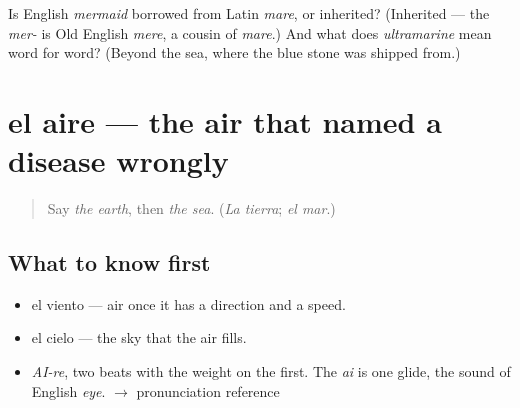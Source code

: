 \begin{tcolorbox}[breakable,colback=teal!4,colframe=teal!35!black,title={Before you move on}]
Is English \emph{mermaid} borrowed from Latin \emph{mare}, or inherited? (Inherited — the \emph{mer-} is Old English \emph{mere}, a cousin of \emph{mare}.) And what does \emph{ultramarine} mean word for word? (Beyond the sea, where the blue stone was shipped from.)
\end{tcolorbox}
\section[el aire]{el aire — the air that named a disease wrongly}

\label{lesson:ES-C362-aire}



\begin{quote}
Say \emph{the earth}, then \emph{the sea}. (\emph{La tierra}; \emph{el mar}.)
\end{quote}

\subsection*{What to know first}
\begin{itemize}
\raggedright
  \item el viento — air once it has a direction and a speed.
  \item el cielo — the sky that the air fills.
\end{itemize}

\begin{sounds}
\begin{itemize}
\raggedright
  \item \emph{AI-re}, two beats with the weight on the first. The \emph{ai} is one glide, the sound of English \emph{eye}. $\to$ pronunciation reference
\end{itemize}
\end{sounds}

